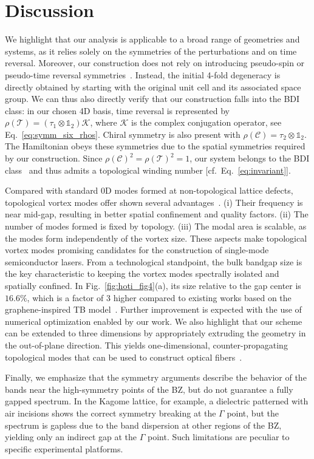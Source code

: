 \section{Discussion}

We highlight that our analysis is applicable to a broad range of geometries and systems, as it relies solely on the symmetries of the perturbations and on time reversal. Moreover, our construction does not rely on introducing pseudo-spin or pseudo-time reversal symmetries~\cite{Wu_Hu_2015}. Instead, the initial 4-fold degeneracy is directly obtained by starting with the original unit cell and its associated space group. We can thus also directly verify that our construction falls into the BDI class: in our chosen 4D basis, time reversal is represented by $\rho(\mathcal{T}) = \left( \tau_1 \otimes \mathbb{1}_2 \right) \mathcal{K}$, where $\mathcal{K}$ is the complex conjugation operator, see Eq.~\eqref{eq:symm_six_rhos}. Chiral symmetry is also present with $\rho(\mathcal{C}) = \tau_2 \otimes \mathbb{1}_2$. The Hamiltonian obeys these symmetries due to the spatial symmetries required by our construction. Since $\rho(\mathcal{C})^2 = \rho(\mathcal{T})^2 = 1$, our system belongs to the BDI class~\cite{Chiu_2016, Teo_2010} and thus admits a topological winding number [cf.~Eq.~\eqref{eq:invariant}].

Compared with standard 0D modes formed at non-topological lattice defects, topological vortex modes offer shown several advantages~\cite{Gao_2020}. (i) Their frequency is near mid-gap, resulting in better spatial confinement and quality factors. (ii) The number of modes formed is fixed by topology.  (iii) The modal area is scalable, as the modes form independently of the vortex size. These aspects make topological vortex modes promising candidates for the construction of single-mode semiconductor lasers. From a technological standpoint, the bulk bandgap size is the key characteristic to keeping the vortex modes spectrally isolated and spatially confined. In Fig.~\ref{fig:hoti_fig4}(a), its size relative to the gap center is $16.6\%$, which is a factor of $3$ higher compared to existing works based on the graphene-inspired TB model~\cite{Gao_2020}. Further improvement is expected with the use of numerical optimization enabled by our work. We also highlight that our scheme can be extended to three dimensions by appropriately extruding the geometry in the out-of-plane direction. This yields one-dimensional, counter-propagating topological modes that can be used to construct optical fibers~\cite{Lin_2020, Lu_2018}.

Finally, we emphasize that the symmetry arguments describe the behavior of the bands near the high-symmetry points of the BZ, but do not guarantee a fully gapped spectrum. In the Kagome lattice, for example, a dielectric patterned with air incisions shows the correct symmetry breaking at the $\Gamma$ point, but the spectrum is gapless due to the band dispersion at other regions of the BZ, yielding only an indirect gap at the $\Gamma$ point. Such limitations are peculiar to specific experimental platforms. 

